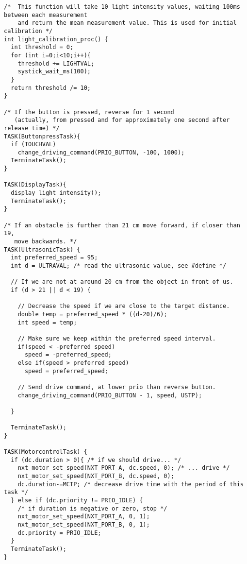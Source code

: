 \documentclass[a4paper,10pt]{report}
\begin{document}
\begin{lstlisting}[label=some-code,caption=part3.c,mathescape]
/*  This function will take 10 light intensity values, waiting 100ms between each measurement
    and return the mean measurement value. This is used for initial calibration */
int light_calibration_proc() {
  int threshold = 0;
  for (int i=0;i<10;i++){
    threshold += LIGHTVAL;
    systick_wait_ms(100);
  }
  return threshold /= 10;
}

/* If the button is pressed, reverse for 1 second
   (actually, from pressed and for approximately one second after release time) */
TASK(ButtonpressTask){
  if (TOUCHVAL)
    change_driving_command(PRIO_BUTTON, -100, 1000); 		
  TerminateTask();
}

TASK(DisplayTask){
  display_light_intensity();
  TerminateTask();
}

/* If an obstacle is further than 21 cm move forward, if closer than 19,
   move backwards. */ 
TASK(UltrasonicTask) {
  int preferred_speed = 95;
  int d = ULTRAVAL; /* read the ultrasonic value, see #define */

  // If we are not at around 20 cm from the object in front of us.
  if (d > 21 || d < 19) {
  
    // Decrease the speed if we are close to the target distance.
    double temp = preferred_speed * ((d-20)/6);
    int speed = temp;

    // Make sure we keep within the preferred speed interval.
    if(speed < -preferred_speed)
      speed = -preferred_speed; 
    else if(speed > preferred_speed) 
      speed = preferred_speed;
    
    // Send drive command, at lower prio than reverse button.
    change_driving_command(PRIO_BUTTON - 1, speed, USTP);
    
  }

  TerminateTask();
}

TASK(MotorcontrolTask) {
  if (dc.duration > 0){ /* if we should drive... */
    nxt_motor_set_speed(NXT_PORT_A, dc.speed, 0); /* ... drive */
    nxt_motor_set_speed(NXT_PORT_B, dc.speed, 0);
    dc.duration-=MCTP; /* decrease drive time with the period of this task */
  } else if (dc.priority != PRIO_IDLE) { 
    /* if duration is negative or zero, stop */
    nxt_motor_set_speed(NXT_PORT_A, 0, 1);
    nxt_motor_set_speed(NXT_PORT_B, 0, 1);
    dc.priority = PRIO_IDLE;
  }
  TerminateTask();
}

\end{lstlisting}
\newpage
\end{document}
